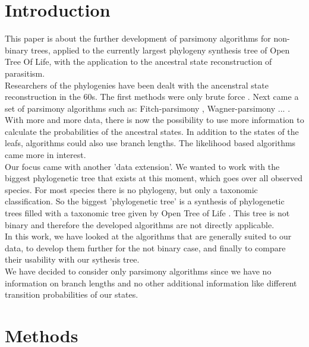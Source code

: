 \chapter{Introduction}
  This paper is about the further development of parsimony algorithms for non-binary trees, applied 
  to the currently largest phylogeny synthesis tree of Open Tree Of Life, with the application to 
  the ancestral state reconstruction of parasitism. \\
  Researchers of the phylogenies have been dealt with the ancenstral state reconstruction in the 
  60s. The first methods were only brute force . 
  Next came a set of parsimony algorithms such as: Fitch-parsimony \cite{Fitch1971}, 
  Wagner-parsimony \cite{Swofford1987} ... . \\
  With more and more data, there is now the possibility to use more information to calculate the 
  probabilities of the ancestral states. In addition to the states of the leafs, algorithms could 
  also use branch lengths. The likelihood based algorithms came more in interest. \\
  Our focus came with another 'data extension'. We wanted to work with the biggest phylogenetic tree 
  that exists at this moment, which goes over all observed species. For most  species 
  there is no 
  phylogeny, but only a taxonomic classification. So the biggest 'phylogenetic tree' is a synthesis 
  of phylogenetic trees filled with a taxonomic tree given by Open Tree of Life \cite{Hinchliff2015}.
  This tree is not binary and therefore the developed algorithms are not directly applicable. \\
  In this work, we have looked at the algorithms that are generally suited to our data, to develop 
  them further for the not binary case, and finally to compare their usability with our sythesis 
  tree. \\
  We have decided to consider only parsimony algorithms since we have no information on branch 
  lengths and no other additional information like different transition probabilities of our states.

\chapter{Methods}
  
